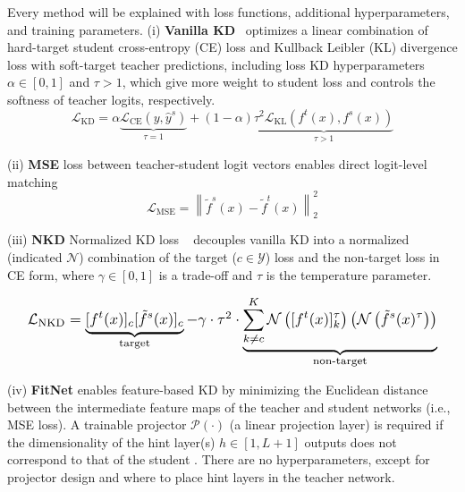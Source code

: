 \documentclass[runningheads]{llncs}
\begin{document}
Every method will be explained with loss functions, additional hyperparameters, and training parameters.
\noindent(i) \textbf{Vanilla KD}~\cite{hinton2015distilling} optimizes a linear combination of hard-target student cross-entropy (CE) loss and Kullback Leibler (KL) divergence loss with soft-target teacher predictions, including loss KD hyperparameters $\alpha \in [0,1]$ and $\tau > 1$, which give more weight to student loss and controls the softness of teacher logits, respectively. %
\begin{equation*}
    \mathcal{L}_{\mathrm{KD}}= \alpha \underbrace{\mathcal{L}_{\mathrm{CE}}\left(y, \hat{y}^s\right)}_{\tau=1}+(1-\alpha)\underbrace{\tau^2 \mathcal{L}_{\mathrm{KL}}\left(f^t(x), f^s(x)\right)}_{\tau>1}
\end{equation*}


\noindent(ii) \textbf{MSE} loss between teacher-student logit vectors enables direct logit-level matching \cite{kim2021comparing}
\begin{equation*}
    \mathcal{L}_{\mathrm{MSE}}=\left\|\tilde{f}^{s}\left(x\right)-\tilde{f}^{t}\left(x\right)\right\|_{2}^{2}
\end{equation*}

\noindent(iii) \textbf{NKD} Normalized KD loss ~\cite{yang2023knowledge} decouples vanilla KD into a normalized (indicated $\mathcal{N}$) combination of the target ($c \in \mathcal{Y}$) loss and the non-target loss in CE form, %
where $\gamma \in [0,1]$ is a trade-off and $\tau$ is the temperature parameter.

\begin{equation*}
    \resizebox{.95\columnwidth}{!}{$
        \mathcal{L}_{\mathrm{NKD}}= \underbrace{[f^t(x)]_c [\tilde{f}^s(x)]_c}_{\text{target}}-\gamma \cdot \tau^2 \cdot \underbrace{\sum_{k \neq c}^K \mathcal{N}\left([f^t(x)]_k^\tau\right) \left(\mathcal{N}\left(\tilde{f}^s(x)^\tau\right)\right)}_{\text{non-target}}
    $}
\end{equation*}

\noindent(iv) \textbf{FitNet} \cite{romero2014fitnets} enables feature-based KD by minimizing the Euclidean distance between the intermediate feature maps of the teacher and student networks (i.e., MSE loss). A trainable projector $\mathcal{P}(\cdot)$ (\eg a linear projection layer) is required if the dimensionality of the hint layer(s) $h \in [1, L+1]$ outputs does not correspond to that of the student
. There are no hyperparameters, except for projector design and where to place hint layers in the teacher network.
\end{document}

